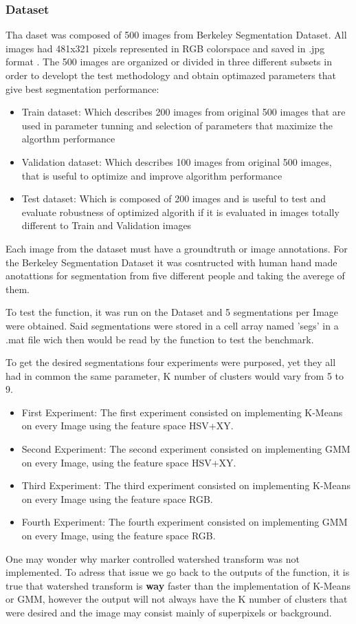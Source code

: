 \documentclass[10pt,twocolumn,letterpaper]{article}
\begin{document}
\subsubsection{Dataset}
Tha daset was composed of 500 images from Berkeley Segmentation Dataset. All images had 481x321 pixels represented in RGB colorspace and saved in .jpg format \cite{bsds}. The 500 images are organized or divided in three different subsets in order to developt the test methodology and obtain optimazed parameters that give best segmentation performance:
\begin{itemize}
    \item Train dataset: Which describes 200 images from original 500 images that are used in parameter tunning and selection of parameters that maximize the algorthm performance
    \item Validation dataset: Which describes 100 images from original 500 images, that is useful to optimize and improve algorithm performance
    \item Test dataset: Which is composed of 200 images and is useful to test and evaluate robustness of optimized algorith if it is evaluated in images totally different to Train and Validation images
\end{itemize}

Each image from the dataset must have a groundtruth or image annotations. For the Berkeley Segmentation Dataset it was cosntructed with human hand made anotattions for segmentation from five different people and taking the averege of them\cite{bsds}.
    

To test the function, it was run on the Dataset and 5 segmentations per Image were obtained. Said segmentations were stored in a cell array named 'segs' in a .mat file wich then would be read by the function to test the benchmark.

To get the desired segmentations four experiments were purposed, yet they all had in common the same parameter, K number of clusters would vary from 5 to 9.

\begin{itemize}
    \item First Experiment: The first experiment consisted on implementing K-Means on every Image  using the feature space HSV+XY.
    \item Second Experiment: The second experiment consisted on implementing GMM on every Image, using the feature space HSV+XY.
    \item Third Experiment: The third experiment consisted on implementing K-Means on every Image  using the feature space RGB.
    \item Fourth Experiment: The fourth experiment consisted on implementing GMM on every Image, using the feature space RGB.
\end{itemize}
One may wonder why marker controlled watershed transform was not implemented. To adress that issue we go back to the outputs of the function, it is true that watershed transform is \textbf{way} faster than the implementation of K-Means or GMM, however the output will not always have the K number of clusters that were desired and the image may consist mainly of superpixels or background.
\end{document}
